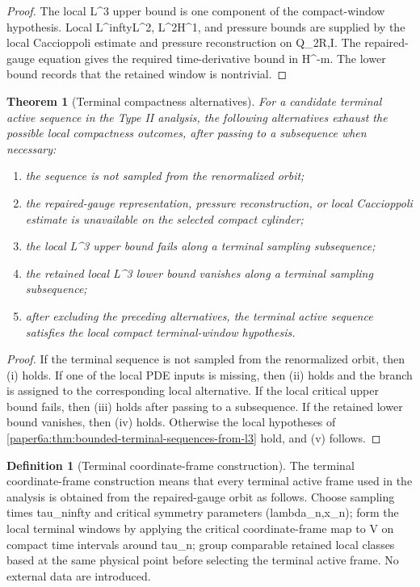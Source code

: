\documentclass[11pt]{amsart}
\def\({}%
\def\){}%
\def\tau{tau}%
\def\lambda{lambda}%
\def\infty{infty}%
\theoremstyle{plain}
\newtheorem{theorem}{Theorem}[section]
\theoremstyle{definition}
\newtheorem{definition}[definition]{Definition}
\theoremstyle{remark}
\begin{document}
\begin{proof}
The local \(L^3\) upper bound is one component of the compact-window
hypothesis.  Local \(L^\infty L^2\), \(L^2H^1\), and pressure bounds are supplied
by the local Caccioppoli estimate and pressure reconstruction on \(Q_{2R,I}\).
The repaired-gauge equation gives the required time-derivative bound in
\(H^{-m}\).  The lower bound records that the retained window is nontrivial.
\end{proof}

\begin{theorem}[Terminal compactness alternatives]
\label{paper6a:thm:terminal-boundedness-alternatives}
For a candidate terminal active sequence in the Type II analysis, the following
alternatives exhaust the possible local compactness outcomes, after passing to a
subsequence when necessary:
\begin{enumerate}[label=\textup{(\roman*)}]
\item the sequence is not sampled from the renormalized orbit;
\item the repaired-gauge representation, pressure reconstruction, or local
Caccioppoli estimate is unavailable on the selected compact cylinder;
\item the local \(L^3\) upper bound fails along a terminal sampling subsequence;
\item the retained local \(L^3\) lower bound vanishes along a terminal sampling
subsequence;
\item after excluding the preceding alternatives, the terminal active sequence
satisfies the local compact terminal-window hypothesis.
\end{enumerate}
\end{theorem}

\begin{proof}
If the terminal sequence is not sampled from the renormalized orbit, then
\textup{(i)} holds.  If one of the local PDE inputs is missing, then
\textup{(ii)} holds and the branch is assigned to the corresponding local
alternative.  If the local critical upper bound fails, then \textup{(iii)}
holds after passing to a subsequence.  If the retained lower bound vanishes,
then \textup{(iv)} holds.  Otherwise the local hypotheses of
\cref{paper6a:thm:bounded-terminal-sequences-from-l3} hold, and
\textup{(v)} follows.
\end{proof}

\begin{definition}[Terminal coordinate-frame construction]
\label{paper6a:def:terminal-coordinate-frame-construction}
The terminal coordinate-frame construction means that every terminal active
frame used in the analysis is obtained from the repaired-gauge orbit as
follows.  Choose sampling times \(\tau_n\to\infty\) and critical symmetry
parameters \((\lambda_n,x_n)\); form the local terminal windows by applying the
critical coordinate-frame map to \(V\) on compact time intervals around
\(\tau_n\); group comparable retained local classes based at the same physical
point before selecting the terminal active frame.  No external data are
introduced.
\end{definition}
\end{document}
